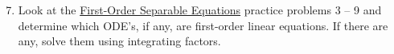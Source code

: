 \documentclass[12pt]{article}
\newif\ifans
\begin{document}
\begin{enumerate}
\setcounter{enumi}{6}

\item Look at the \underline{First-Order Separable Equations} practice problems 3 -- 9 and determine which ODE's, if any, are first-order linear equations.  If there are any, solve them using integrating factors.

\ifans{\fbox{\parbox{1\linewidth}{Problem \#5 is a linear equation since it can be written as $y^{\prime}-x^2y=0$.  The solution is (of course) still $y=Ce^{x^3/3}$.}}} \fi

\end{enumerate}

\medskip


\medskip
\end{document}
